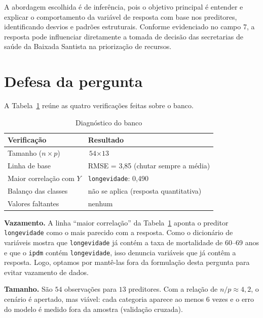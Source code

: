 \documentclass[12pt,a4paper,oneside]{article}\usepackage[]{graphicx}\usepackage[]{xcolor}
\providecommand{\fonte}[1]{\par\medskip\noindent{\footnotesize Fonte: #1}}
\begin{document}
A abordagem escolhida é de inferência, pois o objetivo principal é entender e explicar o comportamento da variável de resposta com base nos preditores, identificando desvios e padrões estruturais. Conforme evidenciado no campo 7, a resposta pode influenciar diretamente a tomada de decisão das secretarias de saúde da Baixada Santista na priorização de recursos.

\section{Defesa da pergunta}
A Tabela~\ref{tab:diag} reúne as quatro verificações feitas sobre o banco.

\begin{table}[htb]
  \centering
  \caption{Diagnóstico do banco}
  \label{tab:diag}
  \small
  \begin{tabular}{@{}p{}p{}@{}}
    \toprule
    \textbf{Verificação} & \textbf{Resultado} \\
    \midrule
    Tamanho ($n \times p$)   & $\text{54} \times \text{13}$ \\
    Linha de base            & RMSE = 3,85 \quad (chutar sempre a m\'edia) \\
    Maior correlação com $Y$ & \texttt{longevidade}: 0,490 \\
    Balanço das classes      & n\~ao se aplica (resposta quantitativa) \\
    Valores faltantes        & nenhum \\
    \bottomrule
  \end{tabular}
  \fonte{Elaborada pelos autores.}
\end{table}

\textbf{Vazamento.} A linha ``maior correlação'' da Tabela~\ref{tab:diag}
aponta o preditor \texttt{longevidade} como o mais parecido com a resposta. Como o dicionário de variáveis mostra que \texttt{longevidade} já contém a taxa de mortalidade de 60–69 anos e que o \texttt{ipdm} contém \texttt{longevidade}, isso denuncia variáveis que já contêm a resposta. Logo, optamos por mantê-las fora da formulação desta pergunta para evitar vazamento de dados.

\textbf{Tamanho.} São $\text{54}$ observações para $\text{13}$ preditores.
Com a relação de $n/p \approx 4,2$, o cenário é apertado, mas viável: cada categoria aparece ao menos 6 vezes e o erro do modelo é medido fora da amostra (validação cruzada).
\end{document}
